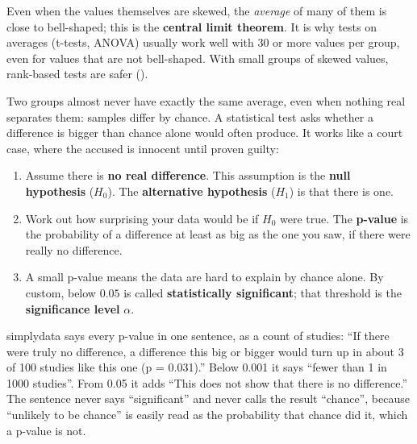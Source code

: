 
Even when the values themselves are skewed, the \emph{average} of many of them is close to
bell-shaped; this is the \textbf{central limit theorem}. It is why tests on averages (t-tests,
ANOVA) usually work well with 30 or more values per group, even for values that are not
bell-shaped. With small groups of skewed values, rank-based tests are safer
().



Two groups almost never have exactly the same average, even when nothing real separates them:
samples differ by chance. A statistical test asks whether a difference is bigger than chance alone
would often produce. It works like a court case, where the accused is innocent until proven
guilty:

\begin{enumerate}
  \item Assume there is \textbf{no real difference}. This assumption is the \textbf{null
    hypothesis} ($H_0$). The \textbf{alternative hypothesis} ($H_1$) is that there is one.
  \item Work out how surprising your data would be if $H_0$ were true. The \textbf{p-value} is the
    probability of a difference at least as big as the one you saw, if there were really no
    difference.
  \item A small p-value means the data are hard to explain by chance alone. By custom, below
    $0.05$ is called \textbf{statistically significant}; that threshold is the
    \textbf{significance level} $\alpha$.
\end{enumerate}

simplydata says every p-value in one sentence, as a count of studies: ``If there were truly no
difference, a difference this big or bigger would turn up in about 3 of 100 studies like this one
(p = 0.031).'' Below 0.001 it says ``fewer than 1 in 1000 studies''. From 0.05 it adds ``This does
not show that there is no difference.'' The sentence never says ``significant'' and never calls the
result ``chance'', because ``unlikely to be chance'' is easily read as the probability that chance
did it, which a p-value is not.

